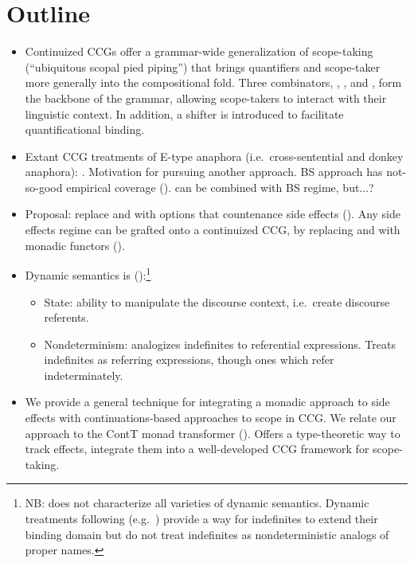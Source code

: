 \section{Outline}
\begin{itemize}
	\item Continuized CCGs offer a grammar-wide generalization of scope-taking (``ubiquitous scopal pied piping'') that brings quantifiers and scope-taker more generally into the compositional fold. Three combinators, , , and , form the backbone of the grammar, allowing scope-takers to interact with their linguistic context. In addition, a  shifter is introduced to facilitate quantificational binding. %
	
	\item Extant CCG treatments of E-type anaphora (i.e.~cross-sentential and donkey anaphora): \citealt{BarkerShan:2008}. Motivation for pursuing another approach. BS approach has not-so-good empirical coverage (\citealt{Charlow:2010}). \citealt{Groote:2006} can be combined with BS regime, but...?%
	
	\item Proposal: replace  and  with options that countenance side effects (\citealt{Shan:2005}). Any side effects regime can be grafted onto a continuized CCG, by replacing  and  with monadic functors (\citealt{Moggi:1989, Wadler:1992, Wadler:1994, Wadler:1995, Shan:2002}).%
	
	\item Dynamic semantics is (\citealt{Shan:2001}):\footnote{NB: does not characterize all varieties of dynamic semantics. Dynamic treatments following \citealt{GroenendijkStokhof:1990} (e.g.~\citealt{Zimmermann:1991, Dekker:1993, Szabolcsi:2003, Groote:2006}) provide a way for indefinites to extend their binding domain but do not treat indefinites as nondeterministic analogs of proper names.}%
	\begin{itemize}
		\item State: ability to manipulate the discourse context, i.e.~create discourse referents.%
		\item Nondeterminism: analogizes indefinites to referential expressions. Treats indefinites as referring expressions, though ones which refer indeterminately.%
	\end{itemize}
	
	\item We provide a general technique for integrating a monadic approach to side effects with continuations-based approaches to scope in CCG. We relate our approach to the ContT monad transformer (\citealt{Liangetal}). Offers a type-theoretic way to track effects, integrate them into a well-developed CCG framework for scope-taking.%
	

\end{itemize}
